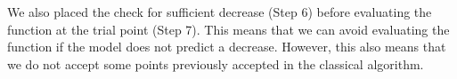 \documentclass{article}
\begin{document}
We also placed the check for sufficient decrease (Step 6) before evaluating the function at the trial point (Step 7).
This means that we can avoid evaluating the function if the model does not predict a decrease.
However, this also means that we do not accept some points previously accepted in the classical algorithm.


% 
% 
% 
%
%
%
%
%
\end{document}
